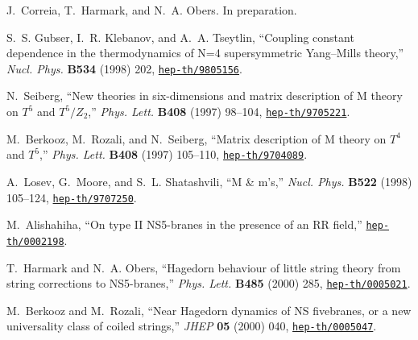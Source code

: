 \documentclass[a4paper,twoside,titlepage,12pt]{article}
\begin{document}
\begin{thebibliography}{10}
J.~Correia, T.~Harmark, and N.~A. Obers. In preparation.

S.~S. Gubser, I.~R. Klebanov, and A.~A. Tseytlin, ``Coupling constant
  dependence in the thermodynamics of {N=4} supersymmetric {Yang--Mills}
  theory,'' {\em Nucl. Phys.} {\bf B534} (1998) 202,
\href{http://www.arXiv.org/abs/hep-th/9805156}{{\tt hep-th/9805156}}.

N.~Seiberg, ``New theories in six-dimensions and matrix description of {M}
  theory on {$T^5$} and {$T^5/Z_2$},'' {\em Phys. Lett.} {\bf B408} (1997)
  98--104,
\href{http://www.arXiv.org/abs/hep-th/9705221}{{\tt hep-th/9705221}}.

M.~Berkooz, M.~Rozali, and N.~Seiberg, ``Matrix description of {M} theory on
  {$T^4$} and {$T^5$},'' {\em Phys. Lett.} {\bf B408} (1997) 105--110,
  \href{http://www.arXiv.org/abs/hep-th/9704089}{{\tt hep-th/9704089}}.

A.~Losev, G.~Moore, and S.~L. Shatashvili, ``M {\&} m's,'' {\em Nucl. Phys.}
  {\bf B522} (1998) 105--124,
  \href{http://www.arXiv.org/abs/hep-th/9707250}{{\tt hep-th/9707250}}.

M.~Alishahiha, ``On type {II} {NS5-branes} in the presence of an {RR} field,''
\href{http://www.arXiv.org/abs/hep-th/0002198}{{\tt hep-th/0002198}}.

T.~Harmark and N.~A. Obers, ``Hagedorn behaviour of little string theory from
  string corrections to {NS5-branes},'' {\em Phys. Lett.} {\bf B485} (2000)
  285,
\href{http://www.arXiv.org/abs/hep-th/0005021}{{\tt hep-th/0005021}}.

M.~Berkooz and M.~Rozali, ``Near {Hagedorn} dynamics of {NS} fivebranes, or a
  new universality class of coiled strings,'' {\em JHEP} {\bf 05} (2000) 040,
\href{http://www.arXiv.org/abs/hep-th/0005047}{{\tt hep-th/0005047}}.

\end{thebibliography}\endgroup
\end{document}
